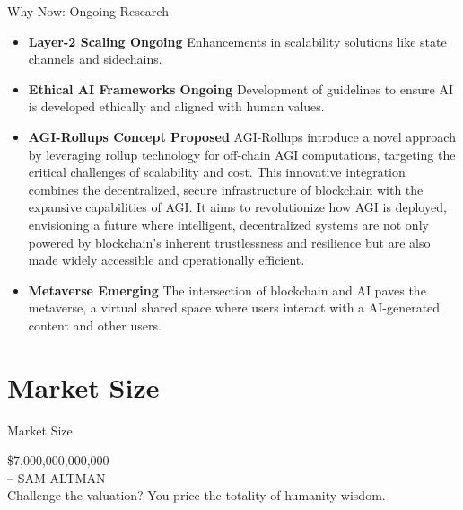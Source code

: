 \documentclass{beamer}
\begin{document}
\begin{frame}{Why Now: Ongoing Research}
\begin{itemize}
    \item \textbf{Layer-2 Scaling \textbar Ongoing \textbar} {\footnotesize Enhancements in scalability solutions like state channels and sidechains.}
    \item \textbf{Ethical AI Frameworks \textbar Ongoing \textbar} {\footnotesize Development of guidelines to ensure AI is developed ethically and aligned with human values.}
    \item \textbf{AGI-Rollups Concept \textbar Proposed \textbar} {\footnotesize AGI-Rollups introduce a novel approach by leveraging rollup technology for off-chain AGI computations, targeting the critical challenges of scalability and cost. This innovative integration combines the decentralized, secure infrastructure of blockchain with the expansive capabilities of AGI. It aims to revolutionize how AGI is deployed, envisioning a future where intelligent, decentralized systems are not only powered by blockchain's inherent trustlessness and resilience but are also made widely accessible and operationally efficient. }
    \item \textbf{Metaverse \textbar Emerging \textbar} {\footnotesize The  intersection of blockchain and AI paves the metaverse, a virtual shared space where users interact with a AI-generated content and other users. }
\end{itemize}
\end{frame}



\section{Market Size}
\begin{frame}{Market Size}
\begin{center}
    \Huge \$7,000,000,000,000\\
    \Large -- SAM ALTMAN \\
    \vspace{3em} %
    \normalsize{Challenge the valuation? You price the totality of humanity wisdom.}
\end{center}
\end{frame}
\end{document}
